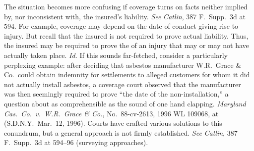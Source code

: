 \documentclass[
  12pt,
  letterpaper,
]{scrartcl}
\begin{document}
The situation becomes more confusing if coverage turns on facts neither implied
by, nor inconsistent with, the insured's liability.
\textit{See} \textit{Catlin}, 387 F.~Supp.~3d at 594. For example, coverage may
depend on the date of conduct giving rise to injury. But recall that the insured
is not required to prove actual liability. Thus, the insured may be required to
prove the  of an injury that may or may not have actually taken place.
 \textit{Id.} If this sounds far-fetched, consider a particularly perplexing example: after deciding that asbestos manufacturer
W.R.~Grace \& Co.~could obtain indemnity for settlements to alleged customers
for whom it did not actually install asbestos, a coverage court observed that the
manufacturer was then seemingly required to prove ``the date of the
non-installation,'' a question about as comprehensible as the sound of one hand
clapping. \textit{Maryland Cas.~Co.~v.~W.R.~Grace \& Co.}, No.~88-cv-2613, 1996
WL 109068, at  (S.D.N.Y.~Mar.~12, 1996). Courts have crafted various
solutions to this conundrum, but a general approach is not firmly established.
\textit{See} \textit{Catlin}, 387 F.~Supp.~3d at 594--96 (surveying
approaches).
\end{document}
